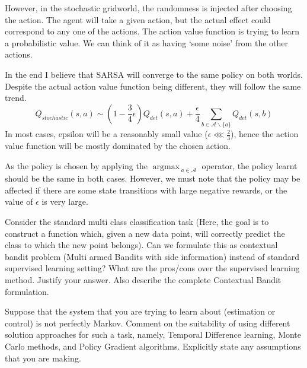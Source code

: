 \documentclass[addpoints,12pt,solution]{exam}
\DeclareMathOperator*{\argmax}{argmax\,}
\begin{document}
\begin{questions}
\begin{enumerate}[label=(\alph*)]
\begin{solution}
                However, in the stochastic gridworld, the randomness is injected after choosing the action. The agent will take a given action, but the actual effect could correspond to any one of the actions.
                The action value function is trying to learn a probabilistic value. We can think of it as having `some noise' from the other actions.


                In the end I believe that SARSA will converge to the same policy on both worlds. Despite the actual action value function being different, they will follow the same trend.
                \[
                    Q_{stochastic}(s, a) \sim \left(1-\frac{3}{4}\epsilon\right)Q_{det}(s, a) + \frac{\epsilon}{4}\sum_{b \in \mathcal{A} \backslash \{a\}}Q_{det}(s, b)
                \]
                In most cases, epsilon will be a reasonably small value ($\epsilon \lll \frac{2}{3}$), hence the action value function will be mostly dominated by the chosen action.


                As the policy is chosen by applying the $\argmax_{a\in \mathcal{A}}$ operator, the policy learnt should be the same in both cases.
                However, we must note that the policy may be affected if there are some state transitions with large negative rewards, or the value of $\epsilon$ is very large.

            \end{solution}

        \end{enumerate}

         Consider the standard multi class classification task (Here, the goal is to construct a function which, given a new data point, will correctly predict the class to which the new point belongs). Can we formulate this as contextual bandit problem (Multi armed Bandits with side information) instead of standard supervised learning setting? What are the pros/cons over the supervised learning method. Justify your answer. Also describe the complete Contextual Bandit formulation.

        \begin{solution}

        \end{solution}

        \question[5] [TD, MC, PG] Suppose that the system that you are trying to learn about (estimation or control) is not perfectly Markov. Comment on the suitability of using different solution approaches for such a task, namely, Temporal Difference learning, Monte Carlo methods, and Policy Gradient algorithms. Explicitly state any assumptions that you are making.
        \begin{solution}


\end{solution}
\end{questions}
\end{document}
